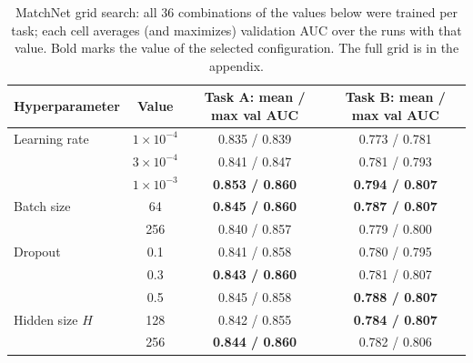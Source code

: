 \begin{table}[H]
\centering\small
\begin{tabularx}{\linewidth}{@{}l c c c@{}}
\toprule
Hyperparameter & Value & Task A: mean / max val AUC & Task B: mean / max val AUC\\
\midrule
Learning rate & $1\times10^{-4}$ & 0.835 / 0.839 & 0.773 / 0.781\\
 & $3\times10^{-4}$ & 0.841 / 0.847 & 0.781 / 0.793\\
 & $1\times10^{-3}$ & \textbf{0.853 / 0.860} & \textbf{0.794 / 0.807}\\
\addlinespace
Batch size & 64 & \textbf{0.845 / 0.860} & \textbf{0.787 / 0.807}\\
 & 256 & 0.840 / 0.857 & 0.779 / 0.800\\
\addlinespace
Dropout & 0.1 & 0.841 / 0.858 & 0.780 / 0.795\\
 & 0.3 & \textbf{0.843 / 0.860} & 0.781 / 0.807\\
 & 0.5 & 0.845 / 0.858 & \textbf{0.788 / 0.807}\\
\addlinespace
Hidden size $H$ & 128 & 0.842 / 0.855 & \textbf{0.784 / 0.807}\\
 & 256 & \textbf{0.844 / 0.860} & 0.782 / 0.806\\
\bottomrule
\end{tabularx}
\caption{MatchNet grid search: all 36 combinations of the values below were trained per task; each cell averages (and maximizes) validation AUC over the runs with that value. Bold marks the value of the selected configuration. The full grid is in the appendix.}\label{tab:mngrid}
\end{table}
